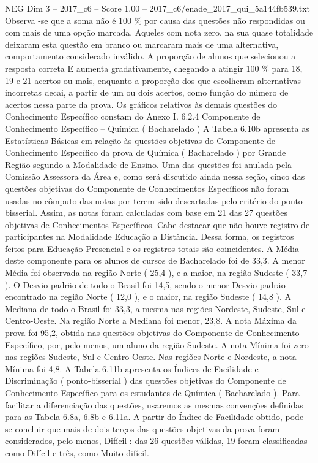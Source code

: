 \begin{textsample}{NEG Dim 3 – 2017\_c6 – Score 1.00 – 2017\_c6/enade\_2017\_qui\_5a144fb539.txt}
Observa -se que a soma não é 100 \% por causa das questões não respondidas ou com mais de uma opção marcada.
Aqueles com nota zero, na sua quase totalidade deixaram esta questão em branco ou marcaram mais de uma alternativa, comportamento considerado inválido.
A proporção de alunos que selecionou a resposta correta E aumenta gradativamente, chegando a atingir 100 \% para 18, 19 e 21 acertos ou mais, enquanto a proporção dos que escolheram alternativas incorretas decai, a partir de um ou dois acertos, como função do número de acertos nessa parte da prova.
Os gráficos relativos às demais questões do Conhecimento Específico constam do Anexo I. 6.2.4 Componente de Conhecimento Específico – Química ( Bacharelado ) A Tabela 6.10b apresenta as Estatísticas Básicas em relação às questões objetivas do Componente de Conhecimento Específico da prova de Química ( Bacharelado ) por Grande Região segundo a Modalidade de Ensino.
Uma das questões foi anulada pela Comissão Assessora da Área e, como será discutido ainda nessa seção, cinco das questões objetivas do Componente de Conhecimentos Específicos não foram usadas no cômputo das notas por terem sido descartadas pelo critério do ponto-bisserial.
Assim, as notas foram calculadas com base em 21 das 27 questões objetivas de Conhecimentos Específicos.
Cabe destacar que não houve registro de participantes na Modalidade Educação a Distância.
Dessa forma, os registros feitos para Educação Presencial e os registros totais são coincidentes.
A Média deste componente para os alunos de cursos de Bacharelado foi de 33,3.
A menor Média foi observada na região Norte ( 25,4 ), e a maior, na região Sudeste ( 33,7 ).
O Desvio padrão de todo o Brasil foi 14,5, sendo o menor Desvio padrão encontrado na região Norte ( 12,0 ), e o maior, na região Sudeste ( 14,8 ).
A Mediana de todo o Brasil foi 33,3, a mesma nas regiões Nordeste, Sudeste, Sul e Centro-Oeste.
Na região Norte a Mediana foi menor, 23,8.
A nota Máxima da prova foi 95,2, obtida nas questões objetivas do Componente de Conhecimento Específico, por, pelo menos, um aluno da região Sudeste.
A nota Mínima foi zero nas regiões Sudeste, Sul e Centro-Oeste.
Nas regiões Norte e Nordeste, a nota Mínima foi 4,8.
A Tabela 6.11b apresenta os Índices de Facilidade e Discriminação ( ponto-bisserial ) das questões objetivas do Componente de Conhecimento Específico para os estudantes de Química ( Bacharelado ).
Para facilitar a diferenciação das questões, usaremos as mesmas convenções definidas para as Tabela 6.8a, 6.8b e 6.11a.
A partir do Índice de Facilidade obtido, pode -se concluir que mais de dois terços das questões objetivas da prova foram considerados, pelo menos, Difícil : das 26 questões válidas, 19 foram classificadas como Difícil e três, como Muito difícil.

\end{textsample}
